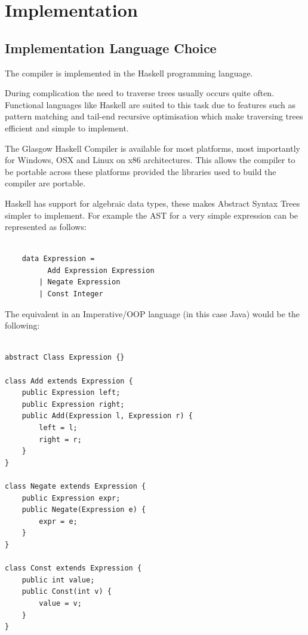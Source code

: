 \chapter{Implementation}


\section{Implementation Language Choice}

The compiler is implemented in the Haskell programming language.

During complication the need to traverse trees usually occurs quite
often. Functional languages like Haskell are suited to this task 
due to features such as pattern matching and tail-end recursive optimisation 
which make traversing trees efficient and simple to implement.

The Glasgow Haskell Compiler is available for most platforms, most importantly for Windows, OSX and Linux 
on x86 architectures. This allows the compiler to be portable across these platforms provided the libraries 
used to build the compiler are portable.

Haskell has support for algebraic data types, these makes Abstract Syntax Trees
simpler to implement. For example the AST for a very simple expression
can be represented as follows:

\begin{lstlisting}[style=myHaskell]

    data Expression =
          Add Expression Expression
        | Negate Expression 
        | Const Integer

\end{lstlisting}

The equivalent in an Imperative/OOP language (in this case Java)
would be the following:

\begin{lstlisting}[style=myJava]

abstract Class Expression {}

class Add extends Expression {
    public Expression left;
    public Expression right;
    public Add(Expression l, Expression r) {
        left = l;
        right = r;    
    } 
}

class Negate extends Expression {
    public Expression expr;
    public Negate(Expression e) {
        expr = e;    
    }
} 

class Const extends Expression {
    public int value;
    public Const(int v) {
        value = v;
    }
}       

\end{lstlisting}

